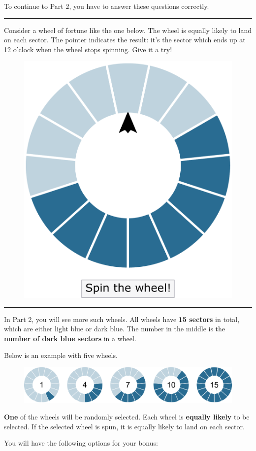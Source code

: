 \noindent To continue to Part 2, you have to answer these questions correctly.

\bigskip
\noindent \rule{\linewidth}{0.4pt}

\noindent Consider a wheel of fortune like the one below.\label{explanation}
The wheel is equally likely to land on each sector.
The pointer indicates the result: it's the sector which ends up at 12 o'clock when the wheel stops spinning.
Give it a try!

\begin{figure}[h!]
	\centering
	{\includegraphics[width=0.4\linewidth]{SpinMe.pdf}}
\end{figure}

\bigskip
\noindent \rule{\linewidth}{0.4pt}

\noindent In Part 2, you will see more such wheels. All wheels have \textbf{15 sectors} in total, which are either light blue or dark blue.
The number in the middle is the \textbf{number of dark blue sectors} in a wheel.
 
\noindent Below is an example with five wheels.

\begin{figure}[h!]
	\centering
	{\includegraphics[width=\linewidth]{Explaining_MAP.pdf}}
\end{figure}

\noindent \textbf{One} of the wheels will be randomly selected. Each wheel is \textbf{equally likely} to be selected. If the selected wheel is spun, it is {equally likely to land on each sector}.

\noindent You will have the following options for your bonus:


